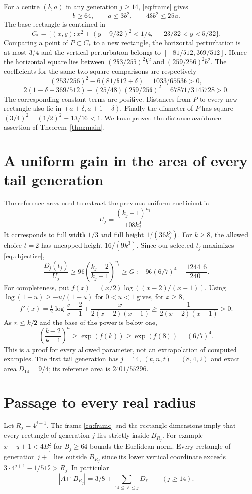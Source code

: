 \documentclass[11pt,a4paper]{article}
\theoremstyle{remark}\newtheorem{remark}[theorem]{Remark}
\begin{document}
For a centre $(b,a)$ in any generation $j\ge14$, \eqref{eq:frame} gives
\[
 b\ge64,\qquad a\le3b^2,\qquad 48b^2\le25a.
\]
The base rectangle is contained in
\[
 C_* =\{(x,y):x^2+(y+9/32)^2<1/4,\ -23/32<y<5/32\}.
\]
Comparing a point of $P\subset C_*$ to a new rectangle, the horizontal
perturbation is at most $3/4$ and the vertical perturbation belongs to
$[-81/512,369/512]$. Hence the horizontal square lies between
$(253/256)^2b^2$ and $(259/256)^2b^2$. The coefficients for the same two
square comparisons are respectively
\[
 (253/256)^2-6(81/512+\delta)=1033/65536>0,
\]
\[
 2(1-\delta-369/512)-(25/48)(259/256)^2
       =67871/3145728>0.
\]
The corresponding constant terms are positive. Distances from $P$ to every
new rectangle also lie in $(a+\delta,a+1-\delta)$. Finally the diameter
of $P$ has square $(3/4)^2+(1/2)^2=13/16<1$.
We have proved the distance-avoidance assertion of Theorem~\ref{thm:main}.

\section{A uniform gain in the area of every tail generation}
The reference area used to extract the previous uniform coefficient is
\[
 U_j=\frac{(k_j-1)^{n_j}}{108k_j^3}.
\]
It corresponds to full width $1/3$ and full height $1/(36k_j^3)$.
For $k\ge8$, the allowed choice $t=2$ has uncapped height $16/(9k^3)$.
Since our selected $t_j$ maximizes \eqref{eq:objective},
\begin{equation}\label{eq:gain}
 \frac{D_j(t_j)}{U_j}\ge96\left(\frac{k_j-2}{k_j-1}\right)^{n_j}
 \ge G:=96(6/7)^4=\frac{124416}{2401}.
\end{equation}
For completeness, put $f(x)=(x/2)\log((x-2)/(x-1))$. Using
$\log(1-u)\ge-u/(1-u)$ for $0<u<1$ gives, for $x\ge8$,
\[
 f'(x)=\tfrac12\log\frac{x-2}{x-1}
       +\frac{x}{2(x-2)(x-1)}
       \ge\frac1{2(x-2)(x-1)}>0.
\]
As $n\le k/2$ and the base of the power is below one,
\[
 \left(\frac{k-2}{k-1}\right)^n
 \ge\exp(f(k))\ge\exp(f(8))=(6/7)^4.
\]
This is a proof for every allowed parameter, not an extrapolation of
computed examples. The first tail generation has $j=14$, $(k,n,t)=(8,4,2)$
and exact area $D_{14}=9/4$; its reference area is $2401/55296$.

\section{Passage to every real radius}
Let $R_j=4^{j+1}$. The frame \eqref{eq:frame} and the rectangle dimensions
imply that every rectangle of generation $j$ lies strictly inside $B_{R_j}$.
For example $x+y+1<4B_j^2$ for $B_j\ge64$ bounds the Euclidean norm.
Every rectangle of generation $j+1$ lies outside $B_{R_j}$ since its lower
vertical coordinate exceeds $3\cdot4^{j+1}-1/512>R_j$.
In particular
\begin{equation}\label{eq:complete-area}
 |A\cap B_{R_j}|=3/8+\sum_{14\le\ell\le j}D_\ell\qquad(j\ge14).
\end{equation}
\end{document}
